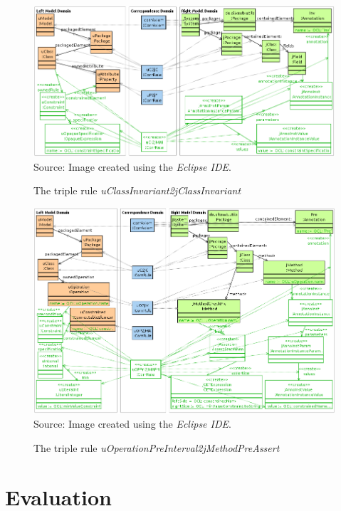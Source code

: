 \documentclass[tuberlin,cic,tc,english,noabntcite,oneside]{iiufrgs}
\begin{document}
\begin{figure}[H]
    \centering
    \caption{The triple rule \emph{uClassInvariant2jClassInvariant}}
    \includegraphics[width=\textwidth]{uCInv2jCInv} \\
    Source: Image created using the \emph{Eclipse IDE}.
    \label{fig:uCInv2jCInv}
\end{figure}
\begin{figure}[H]
	\centering
    \caption{The triple rule \emph{uOperationPreInterval2jMethodPreAssert}}
    \includegraphics[width=\textwidth]{uOPPreInt2jMAPreAssert} \\
    Source: Image created using the \emph{Eclipse IDE}.
    \label{fig:uOPPreInt2jMAPreAssert}
\end{figure}

\section{Evaluation}
\label{subsec:Evaluation}
\end{document}
